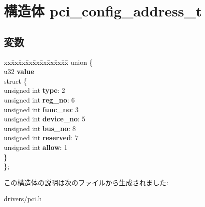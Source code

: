 \section{構造体 pci\-\_\-config\-\_\-address\-\_\-t}
\label{structpci__config__address__t}
\subsection*{変数}
\begin{DoxyCompactItemize}
\item 
\begin{tabbing}
xx\=xx\=xx\=xx\=xx\=xx\=xx\=xx\=xx\=\kill
union \{\\
\>u32 {\bfseries value}\\
\>struct \{\\
\>\>unsigned int {\bfseries type}: 2\\
\>\>unsigned int {\bfseries reg\_no}: 6\\
\>\>unsigned int {\bfseries func\_no}: 3\\
\>\>unsigned int {\bfseries device\_no}: 5\\
\>\>unsigned int {\bfseries bus\_no}: 8\\
\>\>unsigned int {\bfseries reserved}: 7\\
\>\>unsigned int {\bfseries allow}: 1\\
\>\} \label{unionpci__config__address__t_1_1@3_a0977c6c79e266daf955ad5620abbf181}
\\
\}; \label{structpci__config__address__t_a05177a7ac0dd72c3c6d6b71893e03f86}
\\

\end{tabbing}\end{DoxyCompactItemize}


この構造体の説明は次のファイルから生成されました\-:\begin{DoxyCompactItemize}
\item 
drivers/pci.\-h\end{DoxyCompactItemize}
